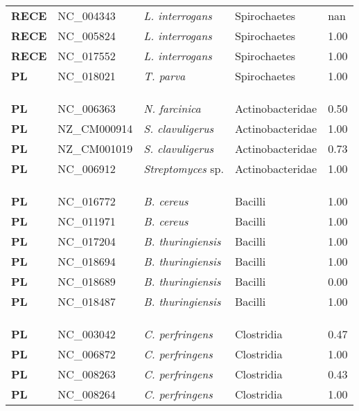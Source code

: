 \begin{adjustwidth}{-3cm}{2cm}
{\begin{supertabular}{>{\bfseries}l|p{0.1\textwidth}p{0.14\textwidth}l|l}
RECE & NC\_004343 &  \textit{L. interrogans} & Spirochaetes & nan\\
RECE & NC\_005824 &  \textit{L. interrogans} & Spirochaetes & 1.00\\
RECE & NC\_017552 &  \textit{L. interrogans} & Spirochaetes & 1.00\\
PL & NC\_018021 &  \textit{T. parva} & Spirochaetes & 1.00\\
\\
\\
\hline\\
PL & NC\_006363 &  \textit{N. farcinica} & Actinobacteridae & 0.50\\
PL & NZ\_CM000914 &  \textit{S. clavuligerus} & Actinobacteridae & 1.00\\
PL & NZ\_CM001019 &  \textit{S. clavuligerus} & Actinobacteridae & 0.73\\
PL & NC\_006912 &  \textit{Streptomyces} sp. & Actinobacteridae & 1.00\\
\\
\\
\hline\\
PL & NC\_016772 &  \textit{B. cereus} & Bacilli & 1.00\\
PL & NC\_011971 &  \textit{B. cereus} & Bacilli & 1.00\\
PL & NC\_017204 &  \textit{B. thuringiensis} & Bacilli & 1.00\\
PL & NC\_018694 &  \textit{B. thuringiensis} & Bacilli & 1.00\\
PL & NC\_018689 &  \textit{B. thuringiensis} & Bacilli & 0.00\\
PL & NC\_018487 &  \textit{B. thuringiensis} & Bacilli & 1.00\\
\\
\\
\hline\\
PL & NC\_003042 &  \textit{C. perfringens} & Clostridia & 0.47\\
PL & NC\_006872 &  \textit{C. perfringens} & Clostridia & 1.00\\
PL & NC\_008263 &  \textit{C. perfringens} & Clostridia & 0.43\\
PL & NC\_008264 &  \textit{C. perfringens} & Clostridia & 1.00\\

\end{supertabular}}
\end{adjustwidth}
